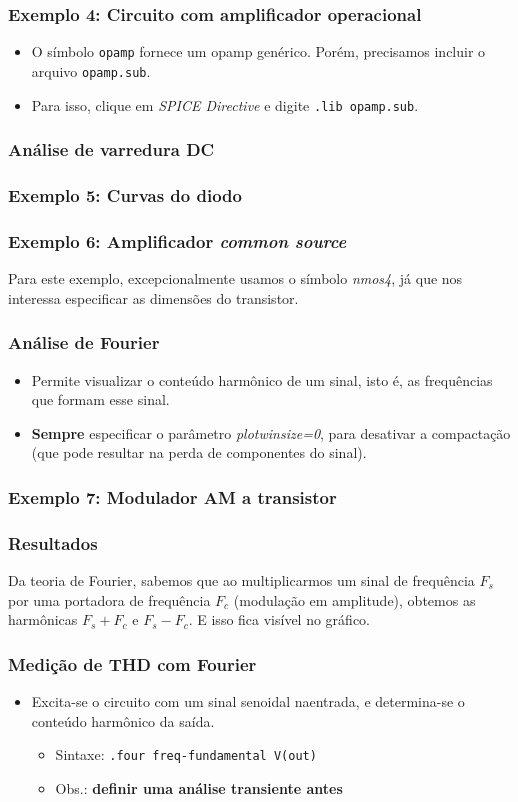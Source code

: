 \documentclass{beamer}
\begin{document}
\begin{frame}
\frametitle{Exemplo 4: Circuito com amplificador operacional}
\begin{itemize}
\item{O símbolo \texttt{opamp} fornece um opamp genérico. Porém, precisamos incluir o arquivo \texttt{opamp.sub}.}
\item{Para isso, clique em \textit{SPICE Directive} e digite \texttt{.lib opamp.sub}}.
\end{itemize}
\end{frame}

\begin{frame}
\frametitle{Análise de varredura DC}
\end{frame}

\begin{frame}
\frametitle{Exemplo 5: Curvas do diodo}
\end{frame}

\begin{frame}
\frametitle{Exemplo 6: Amplificador \textit{common source}}
Para este exemplo, excepcionalmente usamos o símbolo \textit{nmos4}, já que nos interessa especificar as dimensões do transistor.
\end{frame}

\begin{frame}
\frametitle{Análise de Fourier}
\begin{itemize}
\item Permite visualizar o conteúdo harmônico de um sinal, isto é, as frequências que formam esse sinal.
\item \textbf{Sempre} especificar o parâmetro \textit{plotwinsize=0}, para desativar a compactação (que pode resultar na perda de componentes do sinal).
\end{itemize}
\end{frame}

\begin{frame}
\frametitle{Exemplo 7: Modulador AM a transistor}
\end{frame}

\begin{frame}
\frametitle{Resultados}
Da teoria de Fourier, sabemos que ao multiplicarmos um sinal de frequência $F_s$ por uma portadora de frequência $F_c$ (modulação em amplitude), obtemos as harmônicas $F_s + F_c$ e $F_s - F_c$. E isso fica visível no gráfico.
\end{frame}

\begin{frame}
\frametitle{Medição de THD com Fourier}
\begin{itemize}
\item Excita-se o circuito com um sinal senoidal naentrada, e determina-se o conteúdo harmônico da saída.
\begin{itemize}
\item Sintaxe: \texttt{.four freq-fundamental V(out)}
\item Obs.: \textbf{definir uma análise transiente antes}
\end{itemize}
\end{itemize}
\end{frame}
\end{document}
